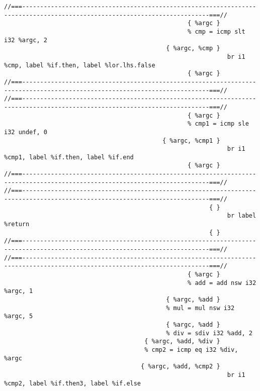 \begin{verbatim}
//===--------------------------------------------------------------------------------------------------------------------------===//
                                                   { %argc }
                                                   % cmp = icmp slt i32 %argc, 2
                                             { %argc, %cmp }
                                                              br i1 %cmp, label %if.then, label %lor.lhs.false
                                                   { %argc }
//===--------------------------------------------------------------------------------------------------------------------------===//
//===--------------------------------------------------------------------------------------------------------------------------===//
                                                   { %argc }
                                                   % cmp1 = icmp sle i32 undef, 0
                                            { %argc, %cmp1 }
                                                              br i1 %cmp1, label %if.then, label %if.end
                                                   { %argc }
//===--------------------------------------------------------------------------------------------------------------------------===//
//===--------------------------------------------------------------------------------------------------------------------------===//
                                                         { }
                                                              br label %return
                                                         { }
//===--------------------------------------------------------------------------------------------------------------------------===//
//===--------------------------------------------------------------------------------------------------------------------------===//
                                                   { %argc }
                                                   % add = add nsw i32 %argc, 1
                                             { %argc, %add }
                                             % mul = mul nsw i32 %argc, 5
                                             { %argc, %add }
                                             % div = sdiv i32 %add, 2
                                       { %argc, %add, %div }
                                       % cmp2 = icmp eq i32 %div, %argc
                                      { %argc, %add, %cmp2 }
                                                              br i1 %cmp2, label %if.then3, label %if.else

\end{verbatim}
